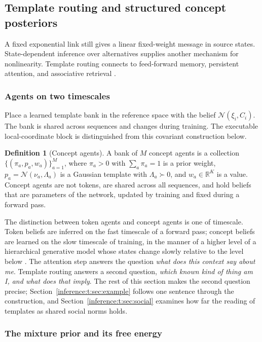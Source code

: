 \documentclass[11pt]{article}
\theoremstyle{definition}
\newtheorem{definition}[theorem]{Definition}
\theoremstyle{remark}
\providecommand{\N}{\mathcal{N}}
\begin{document}
\subsection{Template routing and structured concept posteriors}
\label{inference:t}
A fixed exponential link still gives a linear fixed-weight message in source states. State-dependent inference over alternatives supplies another mechanism for nonlinearity. Template routing connects to feed-forward memory, persistent attention, and associative retrieval \citep{inference:geva2021,inference:sukhbaatar2019,inference:ramsauer2021}.
\subsubsection{Agents on two timescales}

Place a learned template bank in the reference space with the belief $\N(\xi_i,C_i)$. The bank is shared across sequences and changes during training. The executable local-coordinate block is distinguished from this covariant construction below.

\begin{definition}[Concept agents]
A bank of $M$ concept agents is a collection $\{(\pi_a,p_a,w_a)\}_{a=1}^M$, where $\pi_a>0$ with $\sum_a\pi_a=1$ is a prior weight, $p_a=\N(\nu_a,\Lambda_a)$ is a Gaussian template with $\Lambda_a\succ0$, and $w_a\in\mathbb{R}^K$ is a value. Concept agents are not tokens, are shared across all sequences, and hold beliefs that are parameters of the network, updated by training and fixed during a forward pass.
\end{definition}

The distinction between token agents and concept agents is one of timescale. Token beliefs are inferred on the fast timescale of a forward pass; concept beliefs are learned on the slow timescale of training, in the manner of a higher level of a hierarchical generative model whose states change slowly relative to the level below \citep{inference:friston2008hierarchical}. The attention step answers the question \emph{what does this context say about me}. Template routing answers a second question, \emph{which known kind of thing am I, and what does that imply}. The rest of this section makes the second question precise; Section~\ref{inference:t:sec:example} follows one sentence through the construction, and Section~\ref{inference:t:sec:social} examines how far the reading of templates as shared social norms holds.

\subsubsection{The mixture prior and its free energy}
\end{document}
